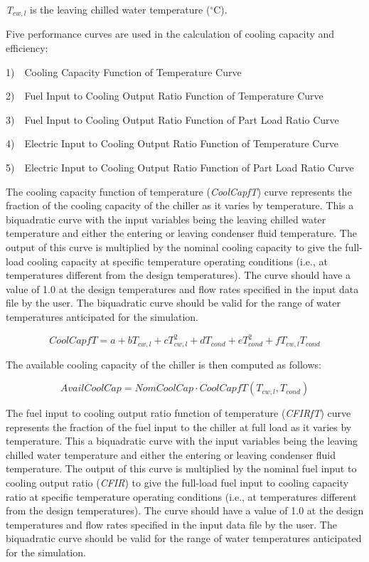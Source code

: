 \emph{T\(_{cw,l}\)} is the leaving chilled water temperature (\(^{\circ}\)C).

Five performance curves are used in the calculation of cooling capacity and efficiency:

1)~~Cooling Capacity Function of Temperature Curve

2)~~Fuel Input to Cooling Output Ratio Function of Temperature Curve

3)~~Fuel Input to Cooling Output Ratio Function of Part Load Ratio Curve

4)~~Electric Input to Cooling Output Ratio Function of Temperature Curve

5)~~Electric Input to Cooling Output Ratio Function of Part Load Ratio Curve

The cooling capacity function of temperature (\emph{CoolCapfT}) curve represents the fraction of the cooling capacity of the chiller as it varies by temperature. This a biquadratic curve with the input variables being the leaving chilled water temperature and either the entering or leaving condenser fluid temperature. The output of this curve is multiplied by the nominal cooling capacity to give the full-load cooling capacity at specific temperature operating conditions (i.e., at temperatures different from the design temperatures). The curve should have a value of 1.0 at the design temperatures and flow rates specified in the input data file by the user. The biquadratic curve should be valid for the range of water temperatures anticipated for the simulation.

\begin{equation}
CoolCapfT = a + b{T_{cw,l}} + cT_{cw,l}^2 + d{T_{cond}} + eT_{cond}^2 + f{T_{cw,l}}{T_{cond}}
\end{equation}

The available cooling capacity of the chiller is then computed as follows:

\begin{equation}
AvailCoolCap = NomCoolCap \cdot CoolCapfT({T_{cw,l}},{T_{cond}})
\end{equation}

The fuel input to cooling output ratio function of temperature (\emph{CFIRfT}) curve represents the fraction of the fuel input to the chiller at full load as it varies by temperature. This a biquadratic curve with the input variables being the leaving chilled water temperature and either the entering or leaving condenser fluid temperature. The output of this curve is multiplied by the nominal fuel input to cooling output ratio (\emph{CFIR}) to give the full-load fuel input to cooling capacity ratio at specific temperature operating conditions (i.e., at temperatures different from the design temperatures). The curve should have a value of 1.0 at the design temperatures and flow rates specified in the input data file by the user. The biquadratic curve should be valid for the range of water temperatures anticipated for the simulation.

